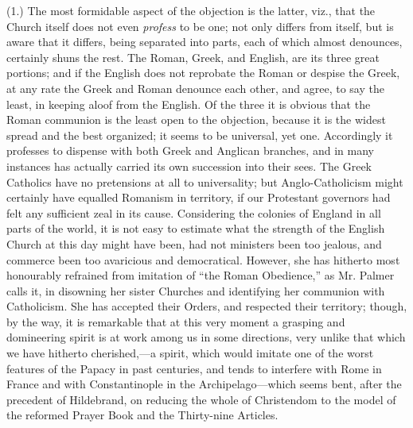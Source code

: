 (1.) The most formidable aspect of the objection
is the latter, viz., that the Church itself does not even \emph{profess}
to be one; not only differs from itself, but is aware that it differs,
being separated into parts, each of which almost denounces, certainly
shuns the rest. The Roman, Greek, and English, are its three great
portions; and if the English does not reprobate the Roman or despise
the Greek, at any rate the Greek and Roman denounce each other, and
agree, to say the least, in keeping aloof from the English. Of the
three it is obvious that the Roman communion is the least open to the
objection, because it is the widest spread and the best organized; it
seems to be universal, yet one. Accordingly it professes to dispense
with both Greek and Anglican branches, and in many instances has
actually carried its own succession into their sees. The Greek
Catholics have no pretensions at all to universality; but
Anglo-Catholicism might certainly have equalled Romanism in territory,
if our Protestant governors had felt any sufficient zeal in its
cause. Considering the colonies of England in all parts of the world,
it is not easy to estimate what the strength of the English Church at
this day might have been, had not ministers been too jealous, and
commerce been too avaricious and democratical. However, she has
hitherto most honourably refrained from imitation of ``the Roman
Obedience,'' as Mr. Palmer calls it, in disowning her sister Churches
and identifying her communion with Catholicism. She has accepted their
Orders, and respected their territory; though, by the way, it is
remarkable that at this very moment a grasping and domineering spirit
is at work among us in some directions, very unlike that which we have
hitherto cherished,—a spirit, which would imitate one of the worst
features of the Papacy in past centuries, and tends to interfere with
Rome in France and with Constantinople in the Archipelago—which
seems bent, after the precedent of Hildebrand, on reducing the whole
of Christendom to the model of the reformed Prayer Book and the
Thirty-nine Articles.

